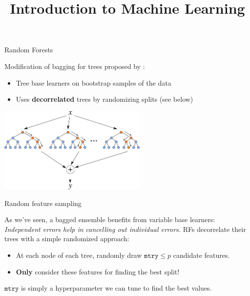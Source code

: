 \documentclass[11pt,compress,t,notes=noshow, xcolor=table]{beamer}
\title{Introduction to Machine Learning}
\institute{\href{https://compstat-lmu.github.io/lecture_i2ml/}{compstat-lmu.github.io/lecture\_i2ml}}
\date{}
\begin{document}
\sloppy

\begin{vbframe}{Random Forests} %

Modification of bagging for trees proposed by :

\begin{itemize}
  \item Tree base learners on bootstrap samples of the data
  \item Uses \textbf{decorrelated} trees by randomizing splits (see below)
\end{itemize}
\begin{center}
\includegraphics[width=0.55\textwidth]{figure_man/forest.png}
\end{center}
\end{vbframe}


\begin{vbframe}{Random feature sampling}

As we've seen, a bagged ensemble benefits from variable base learners: \textit{Independent errors help in cancelling out individual errors.} RFs decorrelate their trees with a simple randomized approach:

\begin{itemize}
  \item At each node of each tree, randomly draw $\texttt{mtry} \le p$ candidate features.
  \item \textbf{Only} consider these features for finding the best split!
\end{itemize}


$\texttt{mtry}$ is simply a hyperparameter we can tune to find the best values.

\end{vbframe}
\end{document}
